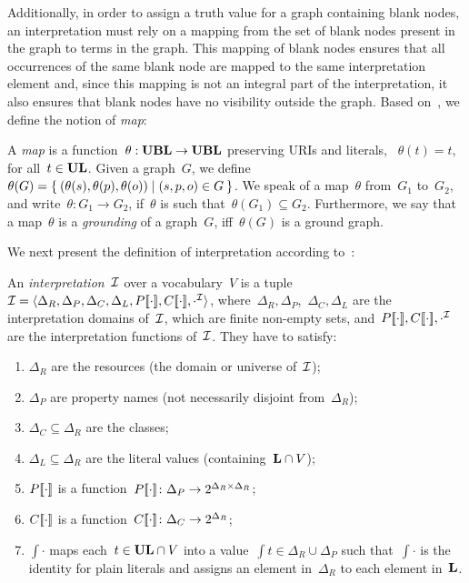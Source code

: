 %
Additionally, in order to assign a truth value for a graph containing blank nodes, an interpretation must rely on a
mapping from the set of blank nodes present in the graph to terms in the graph.  This mapping of blank nodes ensures
that all occurrences of the same blank node are mapped to the same interpretation element and, since this mapping is not
an integral part of the interpretation, it also ensures that blank nodes have no visibility outside the graph.
%
Based on~\citet{MunozPerezGutierrez:2007aa}, we define the notion of \emph{map}:
%
\begin{definition}[Map]
  A \emph{map} is a function~$\theta : \mathbf{UBL} \to \mathbf{UBL}$ preserving URIs and literals, \ie~$\theta(t) = t$, for all~$t \in
  \mathbf{UL}$. 
  Given a graph~$G$, we define~$\theta(G) = \left\{\: (\theta(s), \theta(p), \theta(o)) \mid (s, p, o) \in G \:\right\}$. We speak of
  a map~$\theta$ from~$G_{1}$ to~$G_{2}$, and write~$\theta : G_{1} \to G_{2}$, if~$\theta$ is such that~$\theta(G_{1}) \subseteq
  G_{2}$.
  Furthermore, we say that a map~$\theta$ is a \emph{grounding} of a graph~$G$, iff~$\theta(G)$ is a ground graph.
\end{definition}
%

We next present the definition of interpretation according to~\citet{MunozPerezGutierrez:2007aa}:
%
\begin{definition}
  \label{def:interpretation}
  An \emph{interpretation}~$\mathcal{I}$ over a vocabulary~$V$ is a tuple~$\mathcal{I} =\langle \Delta_{R}, \Delta_{P}, \Delta_{C},
    \Delta_{L}, {P[\![\cdot]\!]}, {C[\![\cdot]\!]}, {\cdot}^{\mathcal{I}} \rangle$, where~$\Delta_{R}, \Delta_{P}$,~$\Delta_{C}, \Delta_{L}$ are
  the interpretation domains of~$\mathcal{I}$, which are finite non-empty sets, and~${P[\![\cdot]\!]}, {C[\![\cdot]\!]}, {\cdot}^{\mathcal{I}}$ are
  the interpretation functions of~$\mathcal{I}$. They have to satisfy:
  \begin{enumerate}[noitemsep]
  \item $\Delta_{R}$ are the resources (the domain or universe of~$\mathcal{I}$);
  \item $\Delta_{P}$ are property names (not necessarily disjoint from~$\Delta_{R}$);
  \item $\Delta_{C} \subseteq \Delta_{R}$ are the classes;
  \item $\Delta_{L} \subseteq \Delta_{R}$ are the literal values (containing~$\mathbf{L} \cap V$);
  \item ${P[\![\cdot]\!]}$ is a function~${P[\![\cdot]\!]}\colon \Delta_{P} \to 2^{\Delta_{R} \times \Delta_{R}}$;
  \item ${C[\![\cdot]\!]}$ is a function~${C[\![\cdot]\!]}\colon \Delta_{C} \to 2^{\Delta_{R}}$;
  \item $\int{\cdot}$ maps each~$t \in \mathbf{UL} \cap V$ into a value~$\int{t} \in \Delta_{R} \cup \Delta_{P}$ such
    that~$\int{\cdot}$ is the identity for plain literals and assigns an element in~$\Delta_{R}$ to each element
    in~$\mathbf{L}$.
  \end{enumerate}
\end{definition}



